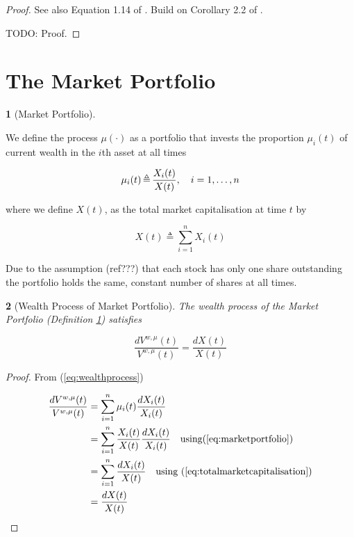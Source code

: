 \documentclass[british]{amsart}
\numberwithin{equation}{section}
\numberwithin{figure}{section}
\theoremstyle{plain}
\newtheorem{thm}{\protect\theoremname}[section]
\theoremstyle{definition}
\newtheorem{defn}[thm]{\protect\definitionname}
\theoremstyle{plain}
\theoremstyle{plain}
\theoremstyle{plain}
\theoremstyle{remark}
\theoremstyle{plain}
\providecommand{\definitionname}{Definition}
\providecommand{\theoremname}{Theorem}
\newcommand{\defeq}{\mathop{\triangleq}}
\begin{document}
\begin{proof}
	See also Equation 1.14 of \cite{fernholz2009}.
	Build on Corollary 2.2 of \cite{fernholz1999}.

	TODO: Proof.
\end{proof}

\section{The Market Portfolio}

\begin{defn} [Market Portfolio]
	\label{def:marketportfolio}

	We define the process $\mu(\cdot)$ as a portfolio that invests the proportion
	$\mu_{i}(t)$ of current wealth in the $i$th asset at all times

	\begin{equation}
		\label{eq:marketportfolio}
		\mu_{i}(t) \defeq \frac{X_{i}(t)}{X(t)},
		\quad \rangei	
	\end{equation}

	where we define $X(t)$, as the total market capitalisation at time $t$ by

	\begin{equation}
		\label{eq:totalmarketcapitalisation}
		X(t) \defeq \sum_{i=1}^{n} X_{i}(t)	
	\end{equation}

  Due to the	assumption (ref???) that each stock has only one share outstanding the portfolio
	holds the same, constant number of shares at all times.

\end{defn}

\begin{thm} [Wealth Process of Market Portfolio]

	The wealth process of the Market Portfolio (Definition \ref{def:marketportfolio}) satisfies

	\begin{equation}
		\label{eq:wealthprocessofmarketportfolio}
			\frac{d{V^{w,\mu}(t)}}{V^{w,\mu}(t)} = \frac{d{X(t)}}{X(t)}  
	\end{equation}

\end{thm}

\begin{proof}

	From (\ref{eq:wealthprocess})

	\begin{gather}
		\begin{split}
			\frac{d{V^{w,\mu}(t)}}{V^{w,\mu}(t)} 
				& = \sum_{i=1}^{n} \mu_{i}(t) \frac{d{X_{i}(t)}}{X_{i}(t)} \\ 
				& = \sum_{i=1}^{n} \frac{X_{i}(t)}{X(t)} \frac{d{X_{i}(t)}}{X_{i}(t)} 
					\quad \text{using} (\ref{eq:marketportfolio}) \\ 
				& = \sum_{i=1}^{n} \frac{d{X_{i}(t)}}{X(t)} 
					\quad \text{using } (\ref{eq:totalmarketcapitalisation}) \\ 
				& = \frac{d{X(t)}}{X(t)}  
		\end{split}
	\end{gather}

\end{proof}
\end{document}
